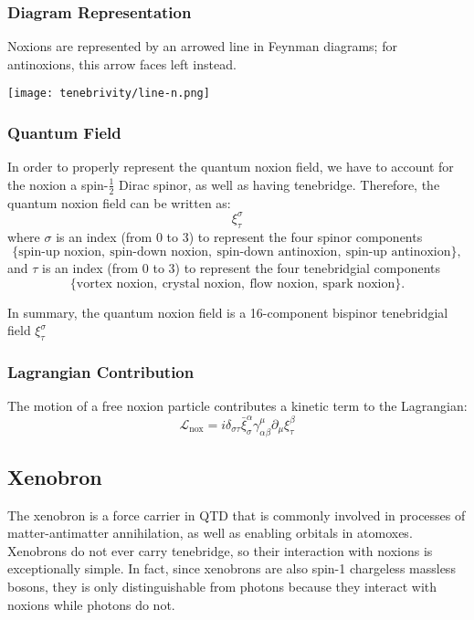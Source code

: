 \subsubsection{Diagram Representation}
Noxions are represented by an arrowed line in Feynman diagrams; for
antinoxions, this arrow faces left instead.

\hfill\texttt{[image: tenebrivity/line-n.png]}\hspace*{\fill}

\subsubsection{Quantum Field}
In order to properly represent the quantum noxion field, we have to account for
the noxion a spin-\(\frac{1}{2}\) Dirac spinor, as well as having tenebridge.
Therefore, the quantum noxion field can be written as:
\[
  \xi^{\sigma}_{\tau}
\]
where \(\sigma\) is an index (from 0 to 3) to represent the four spinor
components
\[
  \{ \text{spin-up noxion},\ \text{spin-down noxion},\ \text{spin-down antinoxion},\ \text{spin-up antinoxion} \},
\]
and \(\tau\) is an index (from 0 to 3) to represent the four tenebridgial
components
\[
  \{ \text{vortex noxion},\ \text{crystal noxion},\ \text{flow noxion},\ \text{spark noxion} \}.
\]

In summary, the quantum noxion field is a 16-component bispinor tenebridgial
field \(\xi^{\sigma}_{\tau}\)

\subsubsection{Lagrangian Contribution}

The motion of a free noxion particle contributes a kinetic term to the
Lagrangian:
\[
  \mathcal{L}_{\text{nox}} = i \delta_{\sigma \tau} \bar{\xi}^{\alpha}_{\sigma} \gamma^{\mu}_{\alpha \beta} \partial_{\mu} \xi^{\beta}_{\tau}
\]

\subsection{Xenobron}
The xenobron is a force carrier in QTD that is commonly involved in processes
of matter-antimatter annihilation, as well as enabling orbitals in atomoxes.
Xenobrons do not ever carry tenebridge, so their interaction with noxions is
exceptionally simple. In fact, since xenobrons are also spin-1 chargeless
massless bosons, they is only distinguishable from photons because they
interact with noxions while photons do not.

